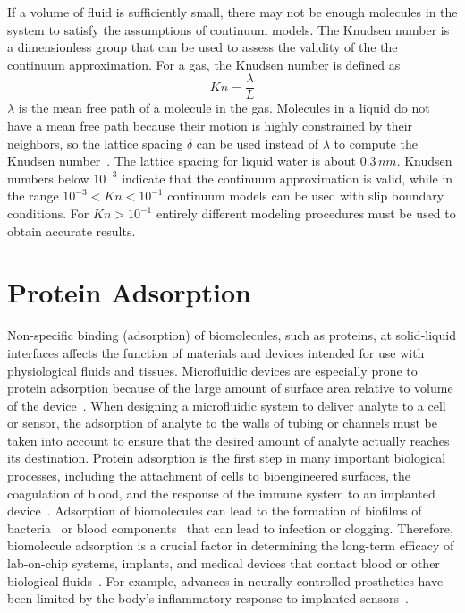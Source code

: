 If a volume of fluid is sufficiently small, there may not be enough
molecules in the system to satisfy the assumptions of continuum models.
The Knudsen number is a dimensionless group that can be used to assess
the validity of the the continuum approximation. For a gas, the Knudsen
number is defined as\[
Kn=\frac{\lambda}{L}\]
$\lambda$ is the mean free path of a molecule in the gas. Molecules
in a liquid do not have a mean free path because their motion is highly
constrained by their neighbors, so the lattice spacing $\delta$ can
be used instead of $\lambda$ to compute the Knudsen number~\cite{Sharp2002}.
The lattice spacing for liquid water is about $0.3\, nm$. Knudsen
numbers below $10^{-3}$ indicate that the continuum approximation
is valid, while in the range $10^{-3}<Kn<10^{-1}$ continuum models
can be used with slip boundary conditions. For $Kn>10^{-1}$ entirely
different modeling procedures must be used to obtain accurate results.


\section{Protein Adsorption}

Non-specific binding (adsorption) of biomolecules, such as proteins,
at solid-liquid interfaces affects the function of materials and devices
intended for use with physiological fluids and tissues. Microfluidic
devices are especially prone to protein adsorption because of the
large amount of surface area relative to volume of the device~\cite{Walker2004}.
When designing a microfluidic system to deliver analyte to a cell
or sensor, the adsorption of analyte to the walls of tubing or channels
must be taken into account to ensure that the desired amount of analyte
actually reaches its destination. Protein adsorption is the first
step in many important biological processes, including the attachment
of cells to bioengineered surfaces, the coagulation of blood, and
the response of the immune system to an implanted device~\cite{Rabe2010}.
Adsorption of biomolecules can lead to the formation of biofilms of
bacteria~\cite{Cheng2007} or blood components~\cite{Sun2003} that
can lead to infection or clogging. Therefore, biomolecule adsorption
is a crucial factor in determining the long-term efficacy of lab-on-chip
systems, implants, and medical devices that contact blood or other
biological fluids~\cite{Roach2007,Latour2005,Ramsden2007}. For example,
advances in neurally-controlled prosthetics have been limited by the
body's inflammatory response to implanted sensors~\cite{Lai2007}. 

